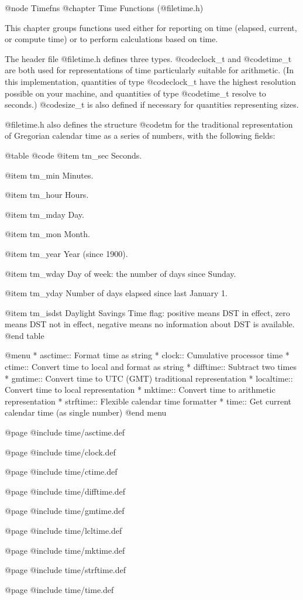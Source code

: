 @node Timefns
@chapter Time Functions (@file{time.h})

This chapter groups functions used either for reporting on time
(elapsed, current, or compute time) or to perform calculations based
on time.

The header file @file{time.h} defines three types.  @code{clock_t} and
@code{time_t} are both used for representations of time particularly
suitable for arithmetic.  (In this implementation, quantities of type
@code{clock_t} have the highest resolution possible on your machine,
and quantities of type @code{time_t} resolve to seconds.)  @code{size_t}
is also defined if necessary for quantities representing sizes. 

@file{time.h} also defines the structure @code{tm} for the traditional
representation of Gregorian calendar time as a series of numbers, with
the following fields: 

@table @code
@item tm_sec
Seconds.

@item tm_min
Minutes.

@item tm_hour
Hours.

@item tm_mday
Day.

@item tm_mon
Month.

@item tm_year
Year (since 1900).

@item tm_wday
Day of week: the number of days since Sunday.

@item tm_yday
Number of days elapsed since last January 1.

@item tm_isdst
Daylight Savings Time flag: positive means DST in effect, zero means DST
not in effect, negative means no information about DST is available.
@end table

@menu
* asctime::     Format time as string
* clock::       Cumulative processor time
* ctime::       Convert time to local and format as string
* difftime::    Subtract two times
* gmtime::      Convert time to UTC (GMT) traditional representation
* localtime::   Convert time to local representation
* mktime::      Convert time to arithmetic representation
* strftime::    Flexible calendar time formatter
* time::        Get current calendar time (as single number)
@end menu

@page
@include time/asctime.def

@page
@include time/clock.def

@page
@include time/ctime.def

@page
@include time/difftime.def

@page
@include time/gmtime.def

@page
@include time/lcltime.def

@page
@include time/mktime.def

@page
@include time/strftime.def

@page
@include time/time.def
